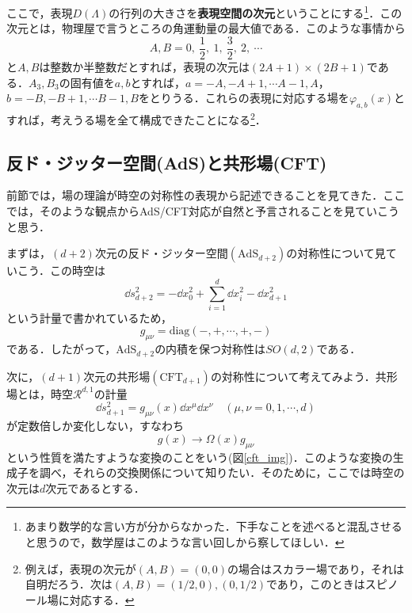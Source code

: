 \documentclass[a4paper,uplatex,dvipdfmx]{jsarticle}
\theoremstyle{definition}
\begin{document}
ここで，表現$D(\Lambda)$の行列の大きさを\textbf{表現空間の次元}ということにする\footnote{
  あまり数学的な言い方が分からなかった．下手なことを述べると混乱させると思うので，数学屋はこのような言い回しから察してほしい．
}．この次元とは，物理屋で言うところの角運動量の最大値である．このような事情から
\begin{equation}
  A,B
  =
  0
  ,\ 
  \frac{1}{2}
  ,\ 
  1
  ,\ 
  \frac{3}{2}
  ,\ 
  2
  ,\ 
  \cdots
\end{equation}
と$A,B$は整数か半整数だとすれば，表現の次元は$(2A+1)\times(2B+1)$である．$A_{3},B_{3}$の固有値を$a,b$とすれば，$a=-A,-A+1,\cdots A-1,A$，$b=-B,-B+1,\cdots B-1,B$をとりうる．これらの表現に対応する場を$\varphi_{a,b}(x)$とすれば，考えうる場を全て構成できたことになる\footnote{
  例えば，表現の次元が$(A,B)=(0,0)$の場合はスカラー場であり，それは自明だろう．次は$(A,B)=(1/2,0),(0,1/2)$であり，このときはスピノール場に対応する．
}．



\subsection{反ド・ジッター空間(AdS)と共形場(CFT)}

前節では，場の理論が時空の対称性の表現から記述できることを見てきた．ここでは，そのような観点からAdS/CFT対応が自然と予言されることを見ていこうと思う．

まずは，$(d+2)$次元の反ド・ジッター空間$(\text{AdS}_{d+2})$の対称性について見ていこう．この時空は
\begin{equation}
  \dd s_{d+2}^2
  =
  -
  \dd x_{0}^{2}
  +
  \sum_{i=1}^{d}
  \dd x_{i}^{2}
  -
  \dd x_{d+1}^{2}
\end{equation}
という計量で書かれているため，
\begin{equation}
  g_{\mu\nu}
  =
  \text{diag}
  (-,+,\cdots,+,-)
\end{equation}
である．したがって，$\text{AdS}_{d+2}$の内積を保つ対称性は$SO(d,2)$である．

次に，$(d+1)$次元の共形場$(\text{CFT}_{d+1})$の対称性について考えてみよう．共形場とは，時空$\mathcal{R}^{d,1}$の計量
\begin{equation}
  \dd s_{d+1}^2
  =
  g_{\mu\nu}(x)\dd x^{\mu}\dd x^{\nu}
  \quad
  (\mu,\nu=0,1,\cdots,d)
\end{equation}
が定数倍しか変化しない，すなわち
\begin{equation}
  g(x)
  \rightarrow
  \Omega(x)g_{\mu\nu}
  \label{comf_tf}
\end{equation}
という性質を満たすような変換のことをいう(図\ref{cft_img})．このような変換の生成子を調べ，それらの交換関係について知りたい．そのために，ここでは時空の次元は$d$次元であるとする．
\end{document}
